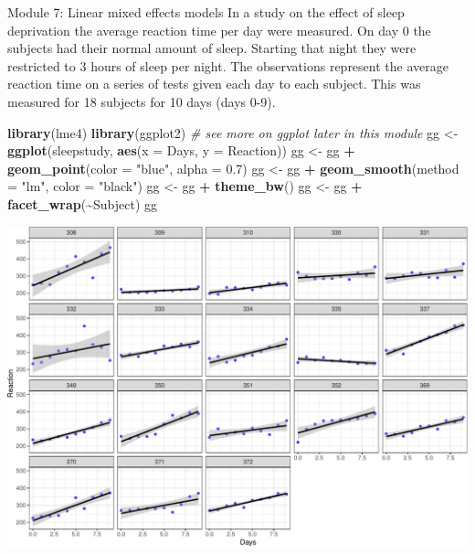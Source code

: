 \documentclass[
  ignorenonframetext,
]{beamer}
\newenvironment{Shaded}{\begin{snugshade}}{\end{snugshade}}
\newcommand{\AttributeTok}[1]{\textcolor[rgb]{0.13,0.29,0.53}{#1}}
\newcommand{\CommentTok}[1]{\textcolor[rgb]{0.56,0.35,0.01}{\textit{#1}}}
\newcommand{\FloatTok}[1]{\textcolor[rgb]{0.00,0.00,0.81}{#1}}
\newcommand{\FunctionTok}[1]{\textcolor[rgb]{0.13,0.29,0.53}{\textbf{#1}}}
\newcommand{\NormalTok}[1]{#1}
\newcommand{\OtherTok}[1]{\textcolor[rgb]{0.56,0.35,0.01}{#1}}
\newcommand{\SpecialCharTok}[1]{\textcolor[rgb]{0.81,0.36,0.00}{\textbf{#1}}}
\newcommand{\StringTok}[1]{\textcolor[rgb]{0.31,0.60,0.02}{#1}}
\begin{document}
\begin{frame}
\begin{block}{Module 7: Linear mixed effects models}
\protect\hypertarget{module-7-linear-mixed-effects-models}{}
In a study on the effect of sleep deprivation the average reaction time
per day were measured. On day 0 the subjects had their normal amount of
sleep. Starting that night they were restricted to 3 hours of sleep per
night. The observations represent the average reaction time on a series
of tests given each day to each subject. This was measured for 18
subjects for 10 days (days 0-9).
\end{block}
\end{frame}

\begin{frame}[fragile]
\tiny

\begin{Shaded}
\begin{Highlighting}[]
\FunctionTok{library}\NormalTok{(lme4)}
\FunctionTok{library}\NormalTok{(ggplot2) }\CommentTok{\# see more on ggplot later in this module}
\NormalTok{gg }\OtherTok{\textless{}{-}} \FunctionTok{ggplot}\NormalTok{(sleepstudy, }\FunctionTok{aes}\NormalTok{(}\AttributeTok{x =}\NormalTok{ Days, }\AttributeTok{y =}\NormalTok{ Reaction))}
\NormalTok{gg }\OtherTok{\textless{}{-}}\NormalTok{ gg }\SpecialCharTok{+} \FunctionTok{geom\_point}\NormalTok{(}\AttributeTok{color =} \StringTok{"blue"}\NormalTok{, }\AttributeTok{alpha =} \FloatTok{0.7}\NormalTok{)}
\NormalTok{gg }\OtherTok{\textless{}{-}}\NormalTok{ gg }\SpecialCharTok{+} \FunctionTok{geom\_smooth}\NormalTok{(}\AttributeTok{method =} \StringTok{"lm"}\NormalTok{, }\AttributeTok{color =} \StringTok{"black"}\NormalTok{)}
\NormalTok{gg }\OtherTok{\textless{}{-}}\NormalTok{ gg }\SpecialCharTok{+} \FunctionTok{theme\_bw}\NormalTok{()}
\NormalTok{gg }\OtherTok{\textless{}{-}}\NormalTok{ gg }\SpecialCharTok{+} \FunctionTok{facet\_wrap}\NormalTok{(}\SpecialCharTok{\textasciitilde{}}\NormalTok{Subject)}
\NormalTok{gg}
\end{Highlighting}
\end{Shaded}

\includegraphics{1Intro_files/figure-beamer/unnamed-chunk-4-1.pdf}

\normalsize
\end{frame}
\end{document}
